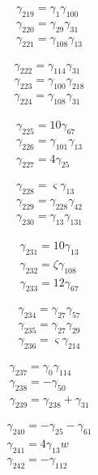 \[\begin{aligned}\gamma_{219}=\gamma_{1} \gamma_{100}\\ \gamma_{220}=\gamma_{29} \gamma_{31}\\ \gamma_{221}=\gamma_{108} \gamma_{13}\end{aligned}\]

\[\begin{aligned}\gamma_{222}=\gamma_{114} \gamma_{31}\\ \gamma_{223}=\gamma_{100} \gamma_{218}\\ \gamma_{224}=\gamma_{108} \gamma_{31}\end{aligned}\]

\[\begin{aligned}\gamma_{225}=10 \gamma_{67}\\ \gamma_{226}=\gamma_{101} \gamma_{13}\\ \gamma_{227}=4 \gamma_{25}\end{aligned}\]

\[\begin{aligned}\gamma_{228}=\varsigma  \gamma_{13}\\ \gamma_{229}=\gamma_{228} \gamma_{42}\\ \gamma_{230}=\gamma_{13} \gamma_{131}\end{aligned}\]

\[\begin{aligned}\gamma_{231}=10 \gamma_{13}\\ \gamma_{232}=\zeta  \gamma_{108}\\ \gamma_{233}=12 \gamma_{67}\end{aligned}\]

\[\begin{aligned}\gamma_{234}=\gamma_{27} \gamma_{57}\\ \gamma_{235}=\gamma_{27} \gamma_{29}\\ \gamma_{236}=\varsigma  \gamma_{214}\end{aligned}\]

\[\begin{aligned}\gamma_{237}=\gamma_{0} \gamma_{114}\\ \gamma_{238}=- \gamma_{50}\\ \gamma_{239}=\gamma_{238} + \gamma_{31}\end{aligned}\]

\[\begin{aligned}\gamma_{240}=- \gamma_{25} - \gamma_{61}\\ \gamma_{241}=4 \gamma_{13} w\\ \gamma_{242}=- \gamma_{112}\end{aligned}\]


